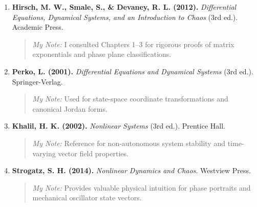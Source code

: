 \documentclass[12pt,a4paper]{article}
\theoremstyle{definition}
\theoremstyle{plain}
\begin{document}
\begin{enumerate}
    \item \textbf{Hirsch, M. W., Smale, S., \& Devaney, R. L. (2012).} \textit{Differential Equations, Dynamical Systems, and an Introduction to Chaos} (3rd ed.). Academic Press.
    \begin{quote}
    \small \textit{My Note:} I consulted Chapters 1--3 for rigorous proofs of matrix exponentials and phase plane classifications.
    \end{quote}
    
    \item \textbf{Perko, L. (2001).} \textit{Differential Equations and Dynamical Systems} (3rd ed.). Springer-Verlag.
    \begin{quote}
    \small \textit{My Note:} Used for state-space coordinate transformations and canonical Jordan forms.
    \end{quote}
    
    \item \textbf{Khalil, H. K. (2002).} \textit{Nonlinear Systems} (3rd ed.). Prentice Hall.
    \begin{quote}
    \small \textit{My Note:} Reference for non-autonomous system stability and time-varying vector field properties.
    \end{quote}
    
    \item \textbf{Strogatz, S. H. (2014).} \textit{Nonlinear Dynamics and Chaos}. Westview Press.
    \begin{quote}
    \small \textit{My Note:} Provides valuable physical intuition for phase portraits and mechanical oscillator state vectors.
    \end{quote}
\end{enumerate}
\end{document}
